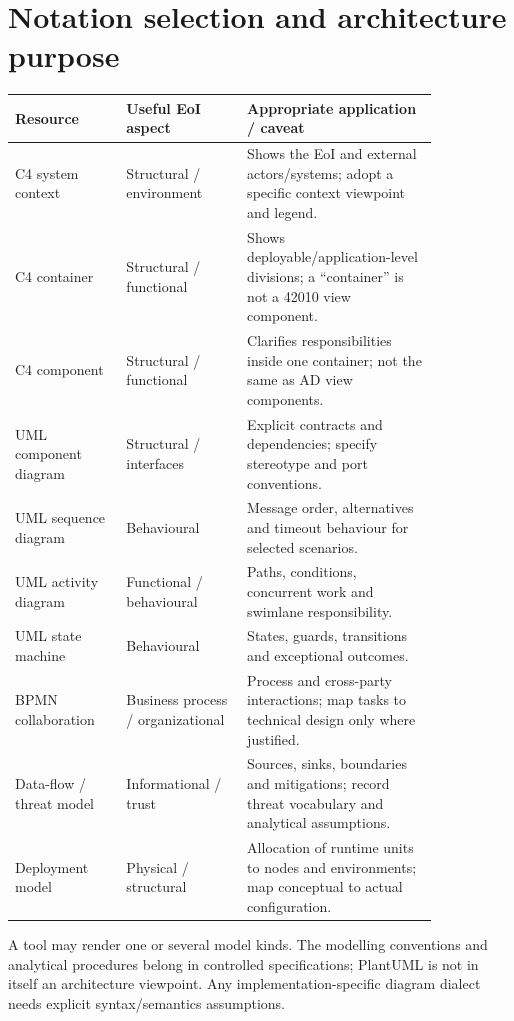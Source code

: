 \documentclass[11pt,letterpaper]{article}
\begin{document}
\section{Notation selection and architecture purpose}
\begin{longtable}{p{0.22\linewidth}p{0.24\linewidth}p{0.38\linewidth}}\toprule\textbf{Resource}&\textbf{Useful EoI aspect}&\textbf{Appropriate application / caveat}\\\midrule\endhead
C4 system context&Structural / environment&Shows the EoI and external actors/systems; adopt a specific context viewpoint and legend.\\
C4 container&Structural / functional&Shows deployable/application-level divisions; a ``container'' is not a 42010 view component.\\
C4 component&Structural / functional&Clarifies responsibilities inside one container; not the same as AD view components.\\
UML component diagram&Structural / interfaces&Explicit contracts and dependencies; specify stereotype and port conventions.\\
UML sequence diagram&Behavioural&Message order, alternatives and timeout behaviour for selected scenarios.\\
UML activity diagram&Functional / behavioural&Paths, conditions, concurrent work and swimlane responsibility.\\
UML state machine&Behavioural&States, guards, transitions and exceptional outcomes.\\
BPMN collaboration&Business process / organizational&Process and cross-party interactions; map tasks to technical design only where justified.\\
Data-flow / threat model&Informational / trust&Sources, sinks, boundaries and mitigations; record threat vocabulary and analytical assumptions.\\
Deployment model&Physical / structural&Allocation of runtime units to nodes and environments; map conceptual to actual configuration.\\\bottomrule\end{longtable}
\begin{Guidance}A tool may render one or several model kinds. The modelling conventions and analytical procedures belong in controlled specifications; PlantUML is not in itself an architecture viewpoint. Any implementation-specific diagram dialect needs explicit syntax/semantics assumptions.\end{Guidance}
\end{document}
